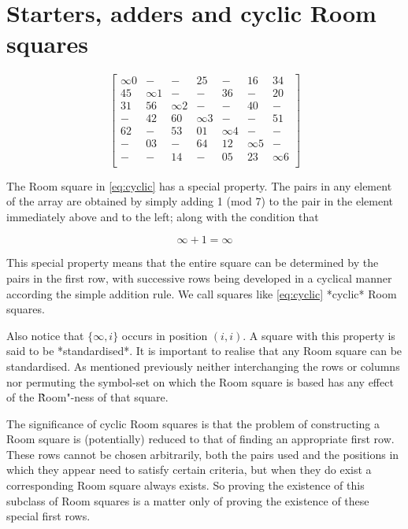 \documentclass[11pt, a4paper]{book}\usepackage[]{graphicx}\usepackage[]{xcolor}
\begin{document}
\section{Starters, adders and cyclic Room squares}

\begin{equation}
  \begin{bmatrix}
    \infty 0 &     -    &     -    &     25     &     -    &     16     &    34    \\
      45     & \infty 1 &     -    &      -     &    36    &      -     &    20    \\
      31     &    56    & \infty 2 &      -     &     -    &     40     &     -    \\
       -     &    42    &    60    &  \infty 3  &     -    &      -     &    51    \\
      62     &     -    &    53    &     01     & \infty 4 &      -     &     -    \\
       -     &    03    &     -    &     64     &    12    &  \infty 5  &     -    \\
       -     &     -    &    14    &      -     &    05    &     23     & \infty 6 \\
  \end{bmatrix}
  \label{eq:cyclic}
\end{equation}

The Room square in \eqref{eq:cyclic} has a
special property. The pairs in any element of the array are
obtained by simply adding 1 (mod 7) to the pair in the
element immediately above and to the left; along with the
condition that

\begin{equation}
  \infty + 1 = \infty
\end{equation}

This special property means that the entire square can be
determined by the pairs in the first row, with successive
rows being developed in a cyclical manner according the
simple addition rule.  We call squares like \eqref{eq:cyclic} 
*cyclic* Room squares.

Also notice that $\{\infty,i\}$ occurs in position $(i,i)$.
A square with this property is said to be *standardised*. It
is important to realise that any Room square can be
standardised. As mentioned previously neither interchanging
the rows or columns nor permuting the symbol-set on which
the Room square is based has any effect of the
\`\`Room"-ness of that square.

The significance of cyclic Room squares is that the problem
of constructing a Room square is (potentially) reduced to
that of finding an appropriate first row. These rows cannot
be chosen arbitrarily, both the pairs used and the positions
in which they appear need to satisfy certain criteria, but
when they do exist a corresponding Room square always
exists. So proving the existence of this subclass of Room
squares is a matter only of proving the existence of these
special first rows.
\end{document}
